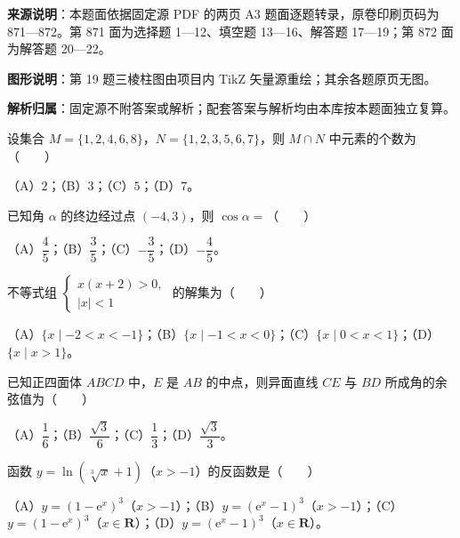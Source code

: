 

\begin{gknotice}
\textbf{来源说明}：本题面依据固定源 PDF 的两页 A3 题面逐题转录，原卷印刷页码为 871—872。第 871 面为选择题 1—12、填空题 13—16、解答题 17—19；第 872 面为解答题 20—22。

\textbf{图形说明}：第 19 题三棱柱图由项目内 TikZ 矢量源重绘；其余各题原页无图。

\textbf{解析归属}：固定源不附答案或解析；配套答案与解析均由本库按本题面独立复算。
\end{gknotice}


\begin{question}
设集合 $M=\{1,2,4,6,8\}$，$N=\{1,2,3,5,6,7\}$，则 $M\cap N$ 中元素的个数为\mbox{（　　）}

（A）$2$；（B）$3$；（C）$5$；（D）$7$。

\end{question}
\begin{question}
已知角 $\alpha$ 的终边经过点 $(-4,3)$，则 $\cos\alpha=$\mbox{（　　）}

（A）$\dfrac45$；（B）$\dfrac35$；（C）$-\dfrac35$；（D）$-\dfrac45$。

\end{question}
\begin{question}
不等式组 $\begin{cases}x(x+2)>0,\\|x|<1\end{cases}$ 的解集为\mbox{（　　）}

（A）$\{x\mid -2<x<-1\}$；（B）$\{x\mid -1<x<0\}$；（C）$\{x\mid 0<x<1\}$；（D）$\{x\mid x>1\}$。

\end{question}
\begin{question}
已知正四面体 $ABCD$ 中，$E$ 是 $AB$ 的中点，则异面直线 $CE$ 与 $BD$ 所成角的余弦值为\mbox{（　　）}

（A）$\dfrac16$；（B）$\dfrac{\sqrt3}{6}$；（C）$\dfrac13$；（D）$\dfrac{\sqrt3}{3}$。

\end{question}
\begin{question}
函数 $y=\ln(\sqrt[3]{x}+1)$（$x>-1$）的反函数是\mbox{（　　）}

（A）$y=(1-\mathrm e^x)^3$（$x>-1$）；（B）$y=(\mathrm e^x-1)^3$（$x>-1$）；（C）$y=(1-\mathrm e^x)^3$（$x\in\mathbf R$）；（D）$y=(\mathrm e^x-1)^3$（$x\in\mathbf R$）。

\end{question}
